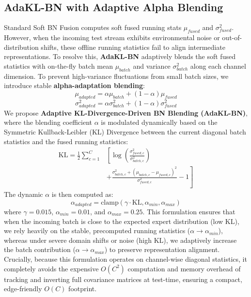\documentclass{article}
\begin{document}
\subsection{AdaKL-BN with Adaptive Alpha Blending}
Standard Soft BN Fusion \cite{df_bayes_ttmm25} computes soft fused running stats $\mu_{fused}$ and $\sigma_{fused}^2$. However, when the incoming test stream exhibits environmental noise or out-of-distribution shifts, these offline running statistics fail to align intermediate representations. To resolve this, \textbf{AdaKL-BN} adaptively blends the soft fused statistics with on-the-fly batch mean $\mu_{batch}$ and variance $\sigma_{batch}^2$ along each channel dimension. To prevent high-variance fluctuations from small batch sizes, we introduce stable \textbf{alpha-adaptation blending}:
\begin{equation}
    \mu_{adapted} = \alpha \mu_{batch} + (1-\alpha) \mu_{fused}
\end{equation}
\begin{equation}
    \sigma_{adapted}^2 = \alpha \sigma_{batch}^2 + (1-\alpha) \sigma_{fused}^2
\end{equation}
We propose \textbf{Adaptive KL-Divergence-Driven BN Blending (AdaKL-BN)}, where the blending coefficient $\alpha$ is modulated dynamically based on the Symmetric Kullback-Leibler (KL) Divergence between the current diagonal batch statistics and the fused running statistics:
\begin{align}
    \text{KL} = \frac{1}{2} \sum_{c=1}^C &\left[ \log \left(\frac{\sigma^2_{fused,c}}{\sigma^2_{batch,c}}\right) \right. \nonumber \\
    &\left. + \frac{\sigma^2_{batch,c} + (\mu_{batch,c} - \mu_{fused,c})^2}{\sigma^2_{fused,c}} - 1 \right]
\end{align}
The dynamic $\alpha$ is then computed as:
\begin{equation}
    \alpha_{adapted} = \text{clamp}(\gamma \cdot \text{KL}, \alpha_{min}, \alpha_{max})
\end{equation}
where $\gamma = 0.015$, $\alpha_{min} = 0.01$, and $\alpha_{max} = 0.25$. This formulation ensures that when the incoming batch is close to the expected expert distribution (low KL), we rely heavily on the stable, precomputed running statistics ($\alpha \to \alpha_{min}$), whereas under severe domain shifts or noise (high KL), we adaptively increase the batch contribution ($\alpha \to \alpha_{max}$) to preserve representation alignment. Crucially, because this formulation operates on channel-wise diagonal statistics, it completely avoids the expensive $O(C^2)$ computation and memory overhead of tracking and inverting full covariance matrices at test-time, ensuring a compact, edge-friendly $O(C)$ footprint.
\end{document}
